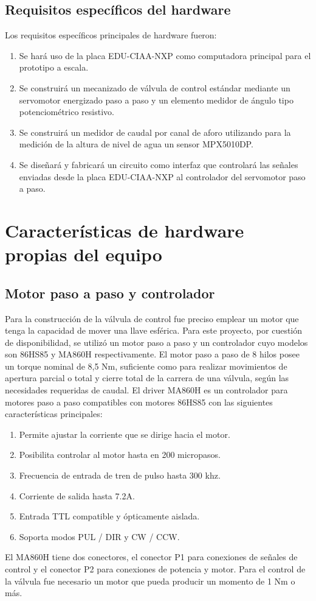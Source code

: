 \subsection{Requisitos específicos del hardware}
\label{subsec:requisitoshw}
 Los requisitos específicos principales de hardware fueron:
\begin{enumerate}
	\item Se hará uso de la placa EDU-CIAA-NXP como computadora principal para el prototipo a escala.
	\item Se construirá un mecanizado de  válvula de control estándar mediante un servomotor energizado paso a paso y un elemento medidor de ángulo tipo potenciométrico resistivo.
	\item Se construirá un medidor de caudal por canal de aforo utilizando para la medición de la altura de nivel de agua un sensor MPX5010DP.
	\item Se diseñará y fabricará un circuito como interfaz que controlará las señales enviadas desde la placa EDU-CIAA-NXP al controlador del servomotor paso a paso. 
\end{enumerate}

\section{Características de hardware propias del equipo}
\label{sec:Características propias del equipo}
\subsection{Motor paso a paso y controlador}
Para la construcción de la válvula de control fue preciso emplear un motor  que tenga la capacidad de mover una llave esférica. Para este proyecto, por cuestión de disponibilidad, se utilizó un motor paso a paso y un controlador cuyo modelos son 86HS85 y MA860H respectivamente.
El motor paso a paso de 8 hilos posee un torque nominal de 8,5 Nm, suficiente como para realizar movimientos de apertura parcial o total y cierre total de la carrera de una válvula, según las necesidades requeridas de caudal. 
El driver MA860H es un controlador para motores paso a paso compatibles con motores 86HS85 con las siguientes características principales:

\begin{enumerate}
	\item Permite ajustar la corriente que se dirige hacia el motor.
	\item Posibilita controlar al motor hasta en 200 micropasos.
	\item Frecuencia de entrada de tren de pulso hasta 300 khz. 
	\item Corriente de salida hasta 7.2A.
	\item Entrada TTL compatible y ópticamente aislada.
	\item Soporta modos PUL / DIR y CW / CCW.
\end{enumerate}
El MA860H tiene dos conectores, el conector P1 para conexiones de señales de control y el conector P2 para conexiones de potencia y motor.     
Para el control de la válvula fue necesario un motor que pueda producir un momento de 1 Nm o más. 
